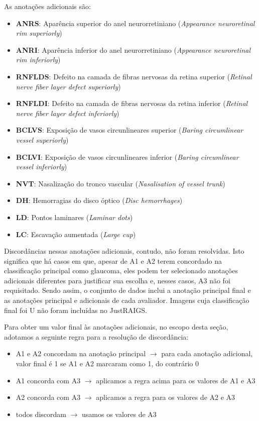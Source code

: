 \documentclass[12pt]{article}
\begin{document}
As anotações adicionais são:
\begin{itemize}
    \setlength\itemsep{0em}
    \item \textbf{ANRS}: Aparência superior do anel neurorretiniano (\emph{Appearance neuroretinal rim superiorly})
    \item \textbf{ANRI}: Aparência inferior do anel neurorretiniano (\emph{Appearance neuroretinal rim inferiorly})
    \item \textbf{RNFLDS}: Defeito na camada de fibras nervosas da retina superior (\emph{Retinal nerve fiber layer defect superiorly})
    \item \textbf{RNFLDI}: Defeito na camada de fibras nervosas da retina inferior (\emph{Retinal nerve fiber layer defect inferiorly})
    \item \textbf{BCLVS}: Exposição de vasos circunlineares superior (\emph{Baring circumlinear vessel superiorly})
    \item \textbf{BCLVI}: Exposição de vasos circunlineares inferior (\emph{Baring circumlinear vessel inferiorly})
    \item \textbf{NVT}: Nasalização do tronco vascular (\emph{Nasalisation of vessel trunk})
    \item \textbf{DH}: Hemorragias do disco óptico (\emph{Disc hemorrhages})
    \item \textbf{LD}: Pontos laminares (\emph{Laminar dots})
    \item \textbf{LC}: Escavação aumentada (\emph{Large cup})
\end{itemize}

Discordâncias nessas anotações adicionais, contudo, não foram resolvidas. Isto significa que há casos em que, apesar de A1 e A2 terem concordado na classificação principal como glaucoma, eles podem ter selecionado anotações adicionais diferentes para justificar sua escolha e, nesses casos, A3 não foi requisitado. Sendo assim, o conjunto de dados inclui a anotação principal final e as anotações principal e adicionais de cada avaliador. Imagens cuja classificação final foi U não foram incluídas no JustRAIGS.


Para obter um valor final às anotações adicionais, no escopo desta seção, adotamos a seguinte regra para a resolução de discordância:

\begin{itemize}[noitemsep,topsep=0pt]
    \item A1 e A2 concordam na anotação principal $\rightarrow$ para cada anotação adicional, valor final é 1 se A1 e A2 marcaram como 1, do contrário 0
    \item A1 concorda com A3 $\rightarrow$ aplicamos a regra acima para os valores de A1 e A3
    \item A2 concorda com A3 $\rightarrow$ aplicamos a regra para os valores de A2 e A3
    \item todos discordam $\rightarrow$ usamos os valores de A3
\end{itemize}
\end{document}
